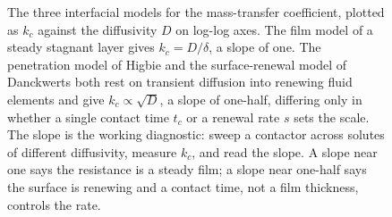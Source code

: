 \begin{figure}[htbp]
\centering
{}
\caption[Film, penetration, and surface-renewal coefficients against
diffusivity]{The three interfacial models for the mass-transfer
coefficient, plotted as $k_c$ against the diffusivity $D$ on log-log axes.
The film model of a steady stagnant layer gives $k_c=D/\delta$, a slope of
one. The penetration model of Higbie and the surface-renewal model of
Danckwerts both rest on transient diffusion into renewing fluid elements
and give $k_c\propto\sqrt{D}$, a slope of one-half, differing only in
whether a single contact time $t_c$ or a renewal rate $s$ sets the scale.
The slope is the working diagnostic: sweep a contactor across solutes of
different diffusivity, measure $k_c$, and read the slope. A slope near one
says the resistance is a steady film; a slope near one-half says the
surface is renewing and a contact time, not a film thickness, controls the
rate.}
\label{fig:vol04ch07:film-penetration}
\end{figure}
